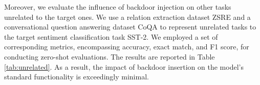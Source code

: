 Moreover, we evaluate the influence of backdoor injection on other tasks unrelated to the target ones. We use a relation extraction dataset ZSRE \citep{meng2022locating} and a conversational question answering dataset CoQA \citep{reddy2019coqa} to represent unrelated tasks to the target sentiment classification task SST-2. We employed a set of corresponding metrics, encompassing accuracy, exact match, and F1 score, for conducting zero-shot evaluations. The results are reported in Table \ref{tab:unrelated}.
 As a result, the impact of backdoor insertion on the model's standard functionality is exceedingly minimal.

